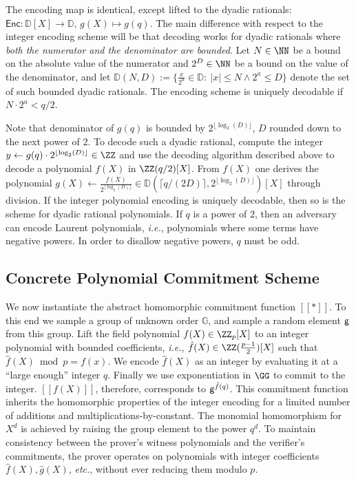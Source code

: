 The encoding map is identical, except lifted to the dyadic rationals: $\mathsf{Enc} : \mathbb{D}[X] \rightarrow \mathbb{D}, \, g(X) \mapsto g(q)$. The main difference with respect to the integer encoding scheme will be that decoding works for dyadic rationals where \emph{both the numerator and the denominator are bounded}. Let $N \in \NN$ be a bound on the absolute value of the numerator and $2^D\in \NN$ be a bound on the value of the denominator, and let $\mathbb{D}(N, D) :=\{\frac{x}{2^a} \in \mathbb{D} : \ |x|\leq N \wedge 2^a \leq D\}$ denote the set of such bounded dyadic rationals. The encoding scheme is uniquely decodable if $N \cdot 2^a < q/2$.
 
Note that denominator of $g(q)$ is bounded by $2^{\lfloor\log_2(D)\rfloor}$, $D$ rounded down to the next power of $2$. To decode such a dyadic rational, compute the integer $y \gets g(q) \cdot 2^{\lfloor\log_2(D)\rfloor}\in \ZZ$  and use the decoding algorithm described above to decode a polynomial $f(X)$ in $\ZZ(q/2)[X]$. From $f(X)$ one derives the polynomial  $g(X) \gets \frac{f(X)}{2^{\lfloor\log_2(D)\rfloor}} \in \mathbb{D}(\lceil q/(2D)\rceil, 2^{\lfloor\log_2(D)\rfloor})[X]$ through division. If the integer polynomial encoding is uniquely decodable, then so is the scheme for dyadic rational polynomials. If $q$ is a power of $2$, then an adversary can encode Laurent polynomials, \emph{i.e.}, polynomials where some terms have negative powers. In order to disallow negative powers, $q$ must be odd.

\subsection{Concrete Polynomial Commitment Scheme}

We now instantiate the abstract homomorphic commitment function $[\![ * ]\!]$. To this end we sample a group of unknown order $\mathbb{G}$, and sample a random element $\mathsf{g}$ from this group. 
Lift the field polynomial $f(X)\in \ZZ_p[X]$ to an integer polynomial with bounded coefficients, \emph{i.e.}, $\hat{f}(X)\in \ZZ(\frac{p-1}{2})[X]$ such that $\hat{f}(X)\bmod p=f(x)$.
We encode $\hat{f}(X)$ as an integer by evaluating it at a ``large enough'' integer $q$. Finally we use exponentiation in $\GG$ to commit to the integer. $[\![f(X)]\!]$, therefore, corresponds to $\mathsf{g}^{\hat{f}(q)}$. This commitment function inherits the homomorphic properties of the integer encoding for a limited number of additions and multiplications-by-constant. The monomial homomorphism for $X^d$ is achieved by raising the group element to the power $q^{d}$. To maintain consistency between the prover's witness polynomials and the verifier's commitments, the prover operates on polynomials with integer coefficients  $\hat{f}(X), \hat{g}(X)$, \emph{etc.}, without ever reducing them modulo $p$.

